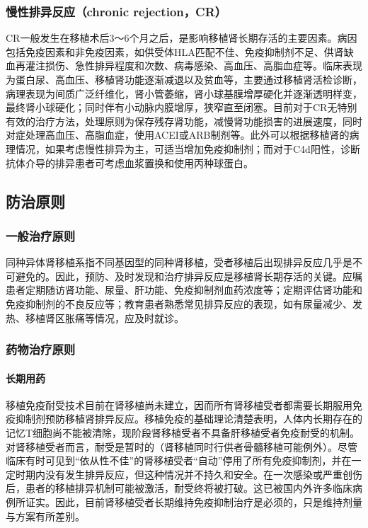 \subsubsection{慢性排异反应（chronic rejection，CR）}

CR一般发生在移植术后3～6个月之后，是影响移植肾长期存活的主要因素。病因包括免疫因素和非免疫因素，如供受体HLA匹配不佳、免疫抑制剂不足、供肾缺血再灌注损伤、急性排异程度和次数、病毒感染、高血压、高脂血症等。临床表现为蛋白尿、高血压、移植肾功能逐渐减退以及贫血等，主要通过移植肾活检诊断，病理表现为间质广泛纤维化，肾小管萎缩，肾小球基膜增厚硬化并逐渐透明样变，最终肾小球硬化；同时伴有小动脉内膜增厚，狭窄直至闭塞。目前对于CR无特别有效的治疗方法，处理原则为保存残存肾功能，减慢肾功能损害的进展速度，同时对症处理高血压、高脂血症，使用ACEI或ARB制剂等。此外可以根据移植肾的病理情况，如果考虑慢性排异为主，可适当增加免疫抑制剂；而对于C4d阳性，诊断抗体介导的排异患者可考虑血浆置换和使用丙种球蛋白。

\subsection{防治原则}

\subsubsection{一般治疗原则}

同种异体肾移植系指不同基因型的同种肾移植，受者移植后出现排异反应几乎是不可避免的。因此，预防、及时发现和治疗排异反应是移植肾长期存活的关键。应嘱患者定期随访肾功能、尿量、肝功能、免疫抑制剂血药浓度等；定期评估肾功能和免疫抑制剂的不良反应等；教育患者熟悉常见排异反应的表现，如有尿量减少、发热、移植肾区胀痛等情况，应及时就诊。

\subsubsection{药物治疗原则}
\paragraph{长期用药}

移植免疫耐受技术目前在肾移植尚未建立，因而所有肾移植受者都需要长期服用免疫抑制剂预防移植肾排异反应。移植免疫的基础理论清楚表明，人体内长期存在的记忆T细胞尚不能被清除，现阶段肾移植受者不具备肝移植受者免疫耐受的机制。对肾移植受者而言，耐受是暂时的（肾移植同时行供者骨髓移植可能例外）。尽管临床有时可见到“依从性不佳”的肾移植受者“自动”停用了所有免疫抑制剂，并在一定时期内没有发生排异反应，但这种情况并不持久和安全。在一次感染或严重创伤后，患者的移植排异机制可能被激活，耐受终将被打破。这已被国内外许多临床病例所证实。因此，目前肾移植受者长期维持免疫抑制治疗是必须的，只是维持剂量与方案有所差别。
